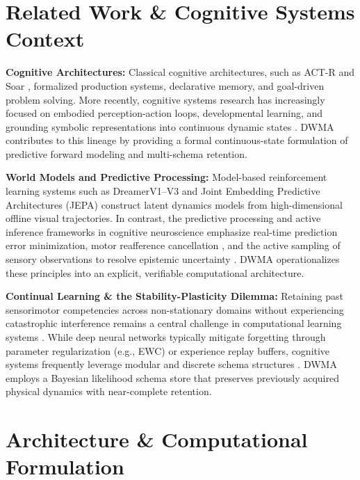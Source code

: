 \documentclass[preprint,12pt]{elsarticle}
\begin{document}
\section{Related Work \& Cognitive Systems Context}
\label{sec:related}
\textbf{Cognitive Architectures:} Classical cognitive architectures, such as ACT-R \citep{anderson1998} and Soar \citep{laird2012}, formalized production systems, declarative memory, and goal-driven problem solving. More recently, cognitive systems research has increasingly focused on embodied perception-action loops, developmental learning, and grounding symbolic representations into continuous dynamic states \citep{vernon2014,morasso2008}. DWMA contributes to this lineage by providing a formal continuous-state formulation of predictive forward modeling and multi-schema retention.

\textbf{World Models and Predictive Processing:} Model-based reinforcement learning systems such as DreamerV1--V3 \citep{hafner2020,hafner2023} and Joint Embedding Predictive Architectures (JEPA) \citep{lecun2022} construct latent dynamics models from high-dimensional offline visual trajectories. In contrast, the predictive processing and active inference frameworks in cognitive neuroscience \citep{friston2010,friston2015,buckley2021} emphasize real-time prediction error minimization, motor reafference cancellation \citep{vonholst1950}, and the active sampling of sensory observations to resolve epistemic uncertainty \citep{oudeyer2007}. DWMA operationalizes these principles into an explicit, verifiable computational architecture.

\textbf{Continual Learning \& the Stability-Plasticity Dilemma:} Retaining past sensorimotor competencies across non-stationary domains without experiencing catastrophic interference remains a central challenge in computational learning systems \citep{french1999,grossberg1982,kirkpatrick2017}. While deep neural networks typically mitigate forgetting through parameter regularization (e.g., EWC) or experience replay buffers, cognitive systems frequently leverage modular and discrete schema structures \citep{whittington2020}. DWMA employs a Bayesian likelihood schema store that preserves previously acquired physical dynamics with near-complete retention.

\section{Architecture \& Computational Formulation}
\label{sec:arch}
\end{document}
